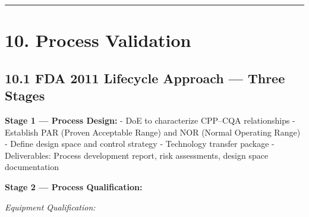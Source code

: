 \documentclass[
  11pt,
  a4paper,
]{report}
\begin{document}
\begin{center}\rule{0.5\linewidth}{0.5pt}\end{center}

\hypertarget{process-validation}{%
\section{10. Process Validation}\label{process-validation}}

\hypertarget{fda-2011-lifecycle-approach-three-stages}{%
\subsection{10.1 FDA 2011 Lifecycle Approach --- Three
Stages}\label{fda-2011-lifecycle-approach-three-stages}}

\textbf{Stage 1 --- Process Design:} - DoE to characterize CPP--CQA
relationships - Establish PAR (Proven Acceptable Range) and NOR (Normal
Operating Range) - Define design space and control strategy - Technology
transfer package - Deliverables: Process development report, risk
assessments, design space documentation

\textbf{Stage 2 --- Process Qualification:}

\emph{Equipment Qualification:}
\end{document}
